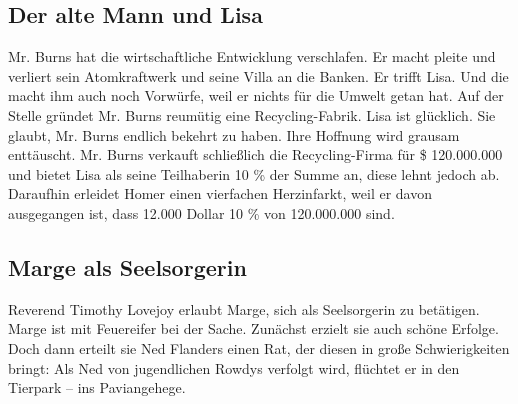 \subsection{Der alte Mann und Lisa}\label{4F17}
Mr. Burns hat die wirtschaftliche Entwicklung verschlafen. Er macht pleite und verliert sein Atomkraftwerk und seine Villa an die Banken. Er trifft Lisa. Und die macht ihm auch noch Vorwürfe, weil er nichts für die Umwelt getan hat. Auf der Stelle gründet Mr. Burns reumütig eine Recycling-Fabrik. Lisa ist glücklich. Sie glaubt, Mr. Burns endlich bekehrt zu haben. Ihre Hoffnung wird grausam enttäuscht. Mr. Burns verkauft schließlich die Recycling-Firma für \$ 120.000.000 und bietet Lisa als seine Teilhaberin 10 \% der Summe an, diese lehnt jedoch ab. Daraufhin erleidet Homer einen vierfachen Herzinfarkt, weil er davon ausgegangen ist, dass 12.000 Dollar 10 \% von 120.000.000 sind.

	
\subsection{Marge als Seelsorgerin}\label{4F18}
Reverend Timothy Lovejoy erlaubt Marge, sich als Seelsorgerin zu betätigen. Marge ist mit Feuereifer bei der Sache. Zunächst erzielt sie auch schöne Erfolge. Doch dann erteilt sie Ned Flanders einen Rat, der diesen in große Schwierigkeiten bringt: Als Ned von jugendlichen Rowdys verfolgt wird, flüchtet er in den Tierpark -- ins Paviangehege.

